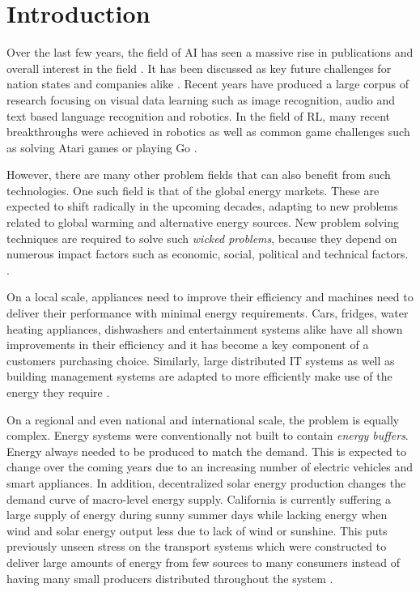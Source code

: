 \chapter{Introduction}

Over the last few years, the field of \ac {AI} has seen a massive rise in publications and overall interest in the field
\cite[]{arulkumaran2017brief, russell2016artificial}.
It has been discussed as key future challenges for nation states and companies alike 
\cite[]{mozur_markoff_2017, faznetchina_2018}. Recent years have produced a large corpus of research focusing on visual data learning such
as image recognition, audio and text based language recognition and robotics. In the field of \ac {RL}, many recent
breakthroughs were achieved in robotics as well as common game challenges such as solving Atari games or playing Go
\cite[]{arulkumaran2017brief}. 

However, there are many other problem fields that can also benefit from such technologies. One such field is that of the
global energy markets. These are expected to shift radically in the upcoming decades, adapting to new problems related to global warming and alternative
energy sources. New problem solving techniques are required to solve such \emph{wicked problems}, because they depend on
numerous impact factors such as economic, social, political and technical factors. 
\cite[]{ketter2015competitive}. 

On a local scale, appliances need to improve their efficiency and machines need to deliver their performance with
minimal energy requirements. Cars, fridges, water heating appliances, dishwashers and entertainment systems alike have
all shown improvements in their efficiency and it has become a key component of a customers purchasing choice.
Similarly, large distributed IT systems as well as building management systems are adapted to more efficiently make use
of the energy they require
\cite[]{Orgerie:2014:STI:2597757.2532637, DePaola:2014:IMS:2620784.2611779}.

On a regional and even national and international scale, the problem is equally complex. Energy systems were
conventionally not built to contain \emph{energy buffers}. Energy always needed to be produced to match the demand. This
is expected to change over the coming years due to an increasing number of electric vehicles and smart appliances. In
addition, decentralized solar energy production changes the demand curve of macro-level energy supply. California is
currently suffering a large supply of energy during sunny summer days while lacking energy when wind and solar energy
output less due to lack of wind or sunshine. This puts previously unseen stress on the transport systems which were
constructed to deliver large amounts of energy from few sources to many consumers instead of having many small producers
distributed throughout the system
\cite[]{roberts_2016}.

